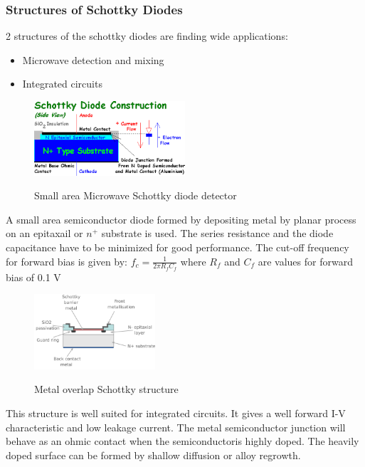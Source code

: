 \begin{frame}
  \frametitle{Structures of Schottky Diodes}
  2 structures of the schottky diodes are finding wide applications:
  \begin{itemize}
  \item Microwave detection and mixing
  \item Integrated circuits
  \end{itemize}
\end{frame}

\begin{frame}
  \begin{figure}[h]
    \caption{Small area Microwave Schottky diode detector}
    \centering
    \includegraphics[width=0.5\textwidth]{./images/chapter8/fig8_6.png}
    \label{fig:8_6}
  \end{figure}
  A small area semiconductor diode formed by depositing metal by planar process on an epitaxail or $n^+$ substrate is used. The series resistance and the diode capacitance have to be minimized for good performance. The cut-off frequency for forward bias is given by:
  $f_c = \frac{1}{2\pi R_{f}C_f}$ where $R_f$ and $C_f$ are values for forward bias of 0.1 V
\end{frame}
\begin{frame}
  \begin{figure}[h]
    \caption{Metal overlap Schottky structure}
    \centering
    \includegraphics[width=0.4\textwidth]{./images/chapter8/fig8_8.png}
    \label{fig:8_8}
  \end{figure}
  This structure is well suited for integrated circuits. It gives a well forward I-V characteristic and low leakage current. The metal semiconductor junction will behave as an ohmic contact when the semiconductoris highly doped. The heavily doped surface can be formed by shallow diffusion or alloy regrowth.
\end{frame}

